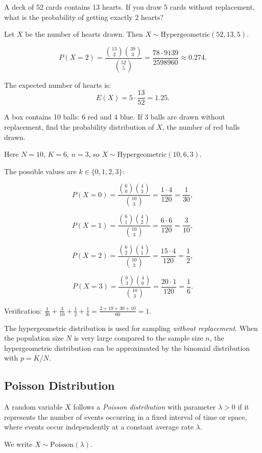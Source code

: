 \begin{eg}
A deck of 52 cards contains 13 hearts. If you draw 5 cards without replacement, what is the probability of getting exactly 2 hearts?

Let \(X\) be the number of hearts drawn. Then \(X \sim \text{Hypergeometric}(52, 13, 5)\).

\[
P(X = 2) = \frac{\binom{13}{2} \binom{39}{3}}{\binom{52}{5}} = \frac{78 \cdot 9139}{2598960} \approx 0.274.
\]

The expected number of hearts is:
\[
E(X) = 5 \cdot \frac{13}{52} = 1.25.
\]
\end{eg}

\begin{eg}
A box contains 10 balls: 6 red and 4 blue. If 3 balls are drawn without replacement, find the probability distribution of \(X\), the number of red balls drawn.

Here \(N = 10\), \(K = 6\), \(n = 3\), so \(X \sim \text{Hypergeometric}(10, 6, 3)\).

The possible values are \(k \in \{0, 1, 2, 3\}\):

\[
P(X = 0) = \frac{\binom{6}{0} \binom{4}{3}}{\binom{10}{3}} = \frac{1 \cdot 4}{120} = \frac{1}{30},
\]

\[
P(X = 1) = \frac{\binom{6}{1} \binom{4}{2}}{\binom{10}{3}} = \frac{6 \cdot 6}{120} = \frac{3}{10},
\]

\[
P(X = 2) = \frac{\binom{6}{2} \binom{4}{1}}{\binom{10}{3}} = \frac{15 \cdot 4}{120} = \frac{1}{2},
\]

\[
P(X = 3) = \frac{\binom{6}{3} \binom{4}{0}}{\binom{10}{3}} = \frac{20 \cdot 1}{120} = \frac{1}{6}.
\]

Verification: \(\frac{1}{30} + \frac{3}{10} + \frac{1}{2} + \frac{1}{6} = \frac{2 + 18 + 30 + 10}{60} = 1\). \checkmark
\end{eg}

\begin{remark}
The hypergeometric distribution is used for sampling \emph{without replacement}. When the population size \(N\) is very large compared to the sample size \(n\), the hypergeometric distribution can be approximated by the binomial distribution with \(p = K/N\).
\end{remark}

\subsection{Poisson Distribution}

\begin{definition}
A random variable \(X\) follows a \emph{Poisson distribution} with parameter \(\lambda > 0\) if it represents the number of events occurring in a fixed interval of time or space, where events occur independently at a constant average rate \(\lambda\).

We write \(X \sim \text{Poisson}(\lambda)\).
\end{definition}

